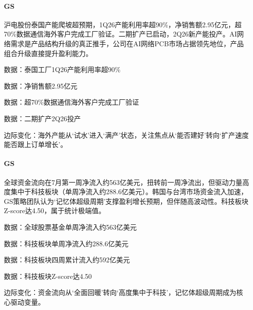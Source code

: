 \documentclass[11pt]{ctexart}
\begin{document}
\paragraph{GS} 沪电股份泰国产能爬坡超预期，1Q26产能利用率超90\%，净销售额2.95亿元，超70\%数据通信海外客户完成工厂验证。二期扩产已启动，2Q26新产能投产。AI网络需求是产品结构升级的真正推手，公司在AI网络PCB市场占据领先地位，产品组合升级直接提升盈利能力。
{\small\color{refgray}数据：泰国工厂1Q26产能利用率超90\%\par}
{\small\color{refgray}数据：净销售额2.95亿元\par}
{\small\color{refgray}数据：超70\%数据通信海外客户完成工厂验证\par}
{\small\color{refgray}数据：二期扩产2Q26投产\par}
{\small\color{refgray}边际变化：海外产能从‘试水’进入‘满产’状态，关注焦点从‘能否建好’转向‘扩产速度能否跟上订单增长’。\par}
\paragraph{GS} 全球资金流向在7月第一周净流入约563亿美元，扭转前一周净流出，但驱动力量高度集中于科技板块（单周净流入约288.6亿美元）。韩国与台湾市场资金流入加速，GS策略团队认为‘记忆体超级周期’支撑盈利增长预期，但伴随高波动性。科技板块Z-score达4.50，属于统计极端值。
{\small\color{refgray}数据：全球股票基金单周净流入约563亿美元\par}
{\small\color{refgray}数据：科技板块单周净流入约288.6亿美元\par}
{\small\color{refgray}数据：科技板块四周累计流入约592亿美元\par}
{\small\color{refgray}数据：科技板块Z-score达4.50\par}
{\small\color{refgray}边际变化：资金流向从‘全面回暖’转向‘高度集中于科技’，记忆体超级周期成为核心驱动变量。\par}
\end{document}

